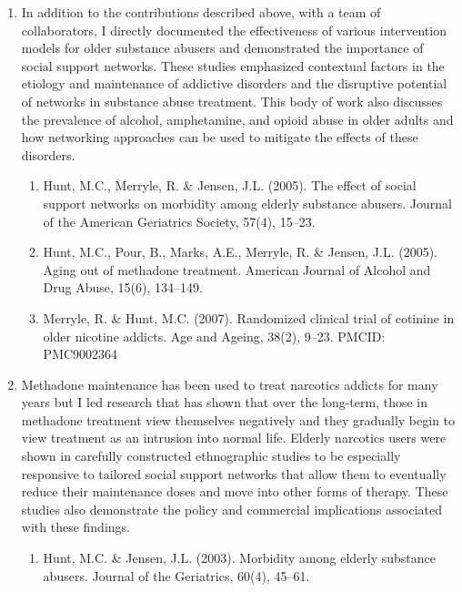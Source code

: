 \documentclass{nihbiosketch}
\begin{document}
\begin{enumerate}
\item In addition to the contributions described above, with a team of
    collaborators, I directly documented the effectiveness of various
    intervention models for older substance abusers and demonstrated the
    importance of social support networks.   These studies emphasized
    contextual factors in the etiology and maintenance of addictive disorders
    and the disruptive potential of networks in substance abuse treatment. This
    body of work also discusses the prevalence of alcohol, amphetamine, and
    opioid abuse in older adults and how networking approaches can be used to
    mitigate the effects of these disorders.    

\begin{enumerate}

\item Hunt, M.C., Merryle, R. \& Jensen, J.L. (2005). The effect of social
        support networks on morbidity among elderly substance abusers. Journal
        of the American Geriatrics Society, 57(4), 15--23.

\item Hunt, M.C., Pour, B., Marks, A.E., Merryle, R. \& Jensen, J.L. (2005).
        Aging out of methadone treatment. American Journal of Alcohol and Drug
        Abuse, 15(6), 134--149. 

\item Merryle, R. \& Hunt, M.C. (2007). Randomized clinical trial of cotinine
        in older nicotine addicts. Age and Ageing, 38(2), 9--23. PMCID:
        PMC9002364

\end{enumerate}

\item Methadone maintenance has been used to treat narcotics addicts for many
    years but I led research that  has shown that over the long-term, those in
    methadone treatment view themselves negatively and they gradually begin to
    view treatment as an intrusion into normal life.   Elderly narcotics users
    were shown in carefully constructed ethnographic studies to be especially
    responsive to tailored social support networks that allow them to
    eventually reduce their maintenance doses and move into other forms of
    therapy.  These studies also demonstrate the policy and commercial
    implications associated with these findings.

\begin{enumerate}   

\item Hunt, M.C. \& Jensen, J.L. (2003). Morbidity among elderly substance
        abusers. Journal of the Geriatrics, 60(4), 45--61.


\end{enumerate}
\end{enumerate}
\end{document}
